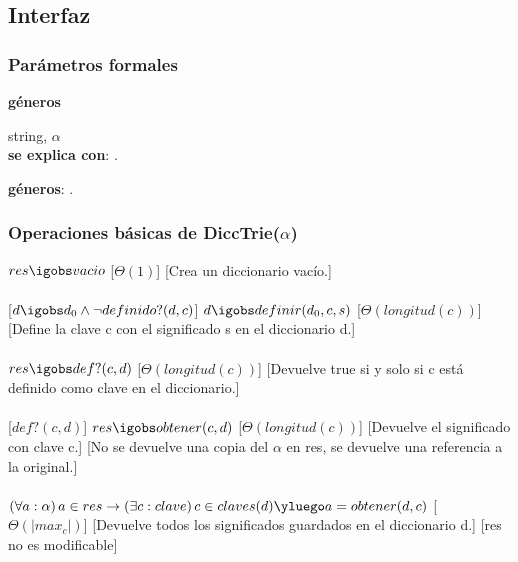 \subsection{Interfaz}


  \subsubsection{Par\'ametros formales}
   \parbox{1.7cm}{\textbf{g\'eneros}} string, $\alpha$\\

  \textbf{se explica con}: .

  \textbf{g\'eneros}: .

  \subsubsection{Operaciones b\'asicas de DiccTrie($\alpha$)}
  {$res \igobs vacio$}%
  [$\Theta(1)$]
  [Crea un diccionario vac\'io.]\\\\
  [$d \igobs d_0 \wedge \neg definido?(d,c)$]
  {$d \igobs definir(d_0,c,s)$}%
  [$\Theta(longitud(c))$]
  [Define la clave c con el significado s en el diccionario d.]\\\\
  {$res \igobs def?(c,d)$}%
  [$\Theta(longitud(c))$]
  [Devuelve true si y solo si c est\'a definido como clave en el diccionario.]\\\\
  [$def?(c,d)$]
  {$res \igobs obtener(c,d)$}%
  [$\Theta(longitud(c))$]
  [Devuelve el significado con clave c.]
  [No se devuelve una copia del $\alpha$ en res, se devuelve una referencia a la original.]\\\\
  {$(\forall a: \alpha) \, a \in res \rightarrow (\exists c: clave) \, c \in claves(d) \yluego a = obtener(d,c) $}%
  [$\Theta(|max_c|)$]
  [Devuelve todos los significados guardados en el diccionario d.]
  [res no es modificable]\\\\

